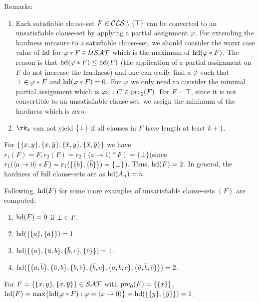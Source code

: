 \documentclass{report}
\begin{document}
Remarks:
\begin{enumerate}
  \item Each satisfiable clause-set $F \in \mathcal{CLS} \setminus \{ \top \}$ can be converted to an unsatisfiable clause-set by applying a partial assignment $\varphi$. For extending the hardness measure to a satisfiable clause-set, we should consider the worst case value of $\operatorname{hd}$ for $\varphi * F \in \mathcal{USAT}$ which is the maximum of $\operatorname{hd}(\varphi * F)$. The reason is that $\operatorname{hd}(\varphi * F) \leq \operatorname{hd}(F)$ (the application of a partial assignment on $F$ do not increase the hardness) and one can easily find a $\varphi$ such that $\bot \in \varphi * F$ and $\operatorname{hd}(\varphi * F)=0$. For $\varphi$ we only need to consider the minimal partial assignment which is $\varphi_C : C \in \operatorname{prc}_0(F)$. For $F = \top$, since it is not convertible to an unsatisfiable clause-set, we assign the minimum of the hardness which is zero.  
  \item $\rk_k$ can not yield $\{ \bot \}$ if all clauses in $F$ have length at least $k+1$.
\end{enumerate}

\begin{examp}\label{exp:harducls}
For $\{ \{ x,y \},\{ x,\overline{y} \},\{ \overline{x},y \},\{ \overline{x},\overline{y} \} \}$ we have $r_1(F)=F, r_2(F)=r_2( \langle a \rightarrow 1 \rangle * F) = \{ \bot \}$(since $r_1( \langle a \rightarrow 0 \rangle * F)=r_1 (\{\{ b \}, \{ \overline b \}\}) = \{ \bot \}$). Thus, $\operatorname{hd}(F) = 2$. In general, the hardness of full clause-sets are as $\operatorname{hd}(A_n)=n$.
  
Following, $\operatorname{hd}(F)$ for some more examples of unsatisfiable clause-sets $(F)$ are computed:
  \begin{enumerate}
  \item $\operatorname{hd}(F) = 0$ if $\bot \in F$.
  \item $\operatorname{hd}(\{ \{ a \},\{ \overline{a} \} \}) = 1$.
  \item $\operatorname{hd}(\{ \{ a \},\{ \overline{a},b \}, \{ \overline{b},c \}, \{ \overline{c} \} \}) = 1$. 
  \item $\operatorname{hd}(\{ \{ a,\overline{b} \},\{ \overline{a},b \},\{ b,\overline{c} \},\{ \overline{b},c \},\{ a,b,c \},\{ \overline{a},\overline{b},\overline{c} \} \}) = 2$.
  \end{enumerate}
\end{examp}

\begin{examp}\label{exp:hd-extd}
For $F = \{ \{ x, y \} , \{ x,\overline y \} \} \in \mathcal{SAT}$ with $\operatorname{prc}_0(F) = \{ \{ x \} \}$,  $\operatorname{hd}(F)= \max \{  \operatorname{hd}(\varphi * F) : \varphi =\langle x \rightarrow 0 \rangle  \}=\operatorname{hd}(\{ \{ y \},\{ \overline y \} \})=1$.
\end{examp}
\end{document}
